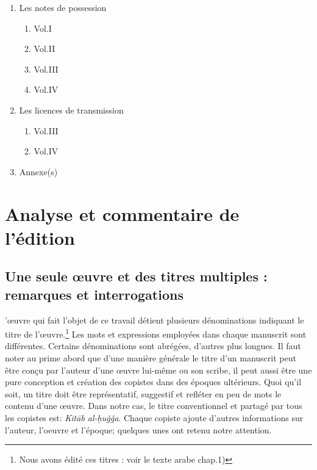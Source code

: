 \documentclass[a4paper,12pt]{report}
\begin{document}
\begin{itemize}
\begin{enumerate}
\begin{enumerate}
\begin{enumerate}
    \end{enumerate}

    \item Les notes de possession 
\begin{enumerate}
     \item Vol.I 
        \item Vol.II
        
        \item Vol.III
        \item Vol.IV
\end{enumerate}
    \item Les licences de transmission 

    \begin{enumerate}
        \item Vol.III
        \item Vol.IV
    \end{enumerate}
    \item Annexe(s)
\end{enumerate}







\chapter{	Analyse et commentaire de l'édition }



\section{	Une seule œuvre et des titres multiples : remarques et interrogations}



’œuvre qui fait l’objet de ce travail détient  plusieurs dénominations indiquant le  titre de l'œuvre.\footnote {Nous avons édité ces titres : voir le texte arabe chap.1)} Les mots et expressions employées dans chaque manuscrit sont différentes. Certains dénominations  sont abrégées, d’autres plus longues. Il faut noter au prime abord que  d'une manière générale le titre d’un manuscrit peut être conçu par l’auteur d’une œuvre lui-même ou son scribe,  il peut aussi être une pure conception et  création des copistes dans des époques ultérieurs. Quoi qu’il  soit,  un titre doit être représentatif,  suggestif et refléter en peu de mots le contenu d’une œuvre.  Dans notre cas, le titre conventionnel et partagé  par tous les copistes est: \textit{Kit\=ab al-ḥuǧǧa}. Chaque copiste ajoute d'autres informations sur l'auteur, l'oeuvre et l'époque; quelques unes ont retenu notre attention.     


\end{enumerate}
\end{itemize}
\end{document}
